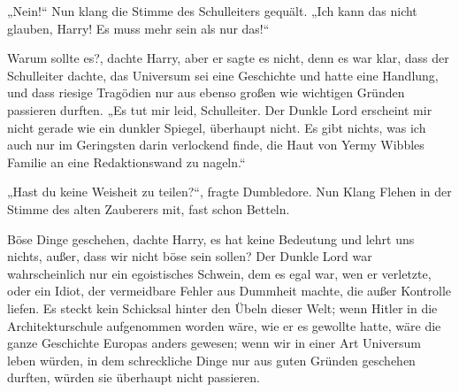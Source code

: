„Nein!“ Nun klang die Stimme des Schulleiters gequält.
„Ich kann das nicht glauben, Harry! Es muss mehr sein als nur das!“

Warum sollte es?, dachte Harry, aber er sagte es nicht, denn es war klar, dass der Schulleiter dachte, das Universum sei eine Geschichte und hatte eine Handlung, und dass riesige Tragödien nur aus ebenso großen wie wichtigen Gründen passieren durften.
„Es tut mir leid, Schulleiter. Der Dunkle Lord erscheint mir nicht gerade wie ein dunkler Spiegel, überhaupt nicht. Es gibt nichts, was ich auch nur im Geringsten darin verlockend finde, die Haut von Yermy Wibbles Familie an eine Redaktionswand zu nageln.“

„Hast du keine Weisheit zu teilen?“, fragte Dumbledore. Nun Klang Flehen in der Stimme des alten Zauberers mit, fast schon Betteln.

Böse Dinge geschehen, dachte Harry, es hat keine Bedeutung und lehrt uns nichts, außer, dass wir nicht böse sein sollen? Der Dunkle Lord war wahrscheinlich nur ein egoistisches Schwein, dem es egal war, wen er verletzte, oder ein Idiot, der vermeidbare Fehler aus Dummheit machte, die außer Kontrolle liefen. Es steckt kein Schicksal hinter den Übeln dieser Welt; wenn Hitler in die Architekturschule aufgenommen worden wäre, wie er es gewollte hatte, wäre die ganze Geschichte Europas anders gewesen; wenn wir in einer Art Universum leben würden, in dem schreckliche Dinge nur aus guten Gründen geschehen durften, würden sie überhaupt nicht passieren.

